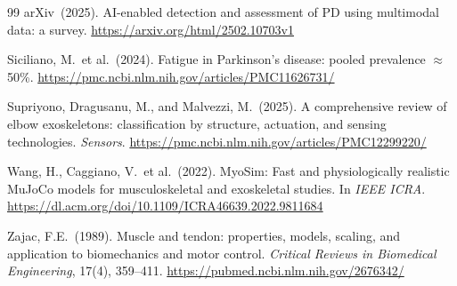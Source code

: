 \documentclass{article}
\begin{document}
\begin{thebibliography}{99}
arXiv\ (2025).
AI-enabled detection and assessment of PD using multimodal data: a survey.
\url{https://arxiv.org/html/2502.10703v1}

Siciliano, M.\ et al.\ (2024).
Fatigue in Parkinson's disease: pooled prevalence $\approx$50\%.
\url{https://pmc.ncbi.nlm.nih.gov/articles/PMC11626731/}

Supriyono, Dragusanu, M., and Malvezzi, M.\ (2025).
A comprehensive review of elbow exoskeletons: classification by structure,
actuation, and sensing technologies.
\textit{Sensors}.
\url{https://pmc.ncbi.nlm.nih.gov/articles/PMC12299220/}

Wang, H., Caggiano, V.\ et al.\ (2022).
MyoSim: Fast and physiologically realistic MuJoCo models for
musculoskeletal and exoskeletal studies.
In \textit{IEEE ICRA}.
\url{https://dl.acm.org/doi/10.1109/ICRA46639.2022.9811684}

Zajac, F.E.\ (1989).
Muscle and tendon: properties, models, scaling, and application to
biomechanics and motor control.
\textit{Critical Reviews in Biomedical Engineering}, 17(4), 359--411.
\url{https://pubmed.ncbi.nlm.nih.gov/2676342/}

\end{thebibliography}
\end{document}
